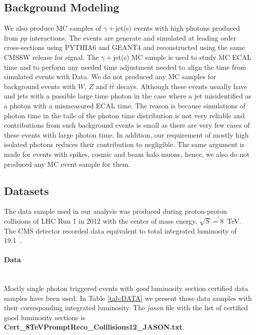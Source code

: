 \subsection{Background Modeling}
We also produce  MC samples of $\gamma +$jet(s) events with high \pt photons produced from  $pp$ interactions. The events are generate and simulated at leading order cross-sections using \textsf{PYTHIA6} and \textsf{GEANT4} and reconstructed using the same CMSSW release for signal.
The $\gamma +$jet(s) MC sample is used to study MC ECAL time and to perform any needed time adjustment needed to align the time from simulated events with Data. 
\newline
We do not produced any MC samples for background events with $W$, $Z$ and $t\bar{t}$ decays. Although these events usually have \MET and jets with a  possible large time photon in the case where a jet misidentified as a photon with a mismeasured ECAL time. The reason is because simulations of photon time in the tails of the photon time distribution is not very reliable and contributions from such background events is small as there are very few cases of these events with large photon time. In addition, our requirement of mostly high \pt isolated photons reduces their contribution to negligible. The same argument is made for events with spikes, cosmic and beam halo muons, hence, we also do not produced any MC event sample for them.
\subsection{Datasets}
The data sample used in our analysis was produced during proton-proton collisions of LHC Run 1 in 2012 with the center of mass energy, $\sqrt{S} = 8$~TeV. The CMS detector recorded data equivalent to total integrated luminosity of 19.1~\fbinv .
\paragraph*{Data}\mbox{}\\
Mostly single photon triggered events with \textit{good} luminosity section certified data samples have been used. In Table \ref{tab:DATA} we present these data samples with their corresponding integrated luminosity. The \textit{jason} file with the list of certified good luminosity sections is
 \textbf{Cert\_8TeVPromptReco\_Colllisions12\_JASON.txt}.
